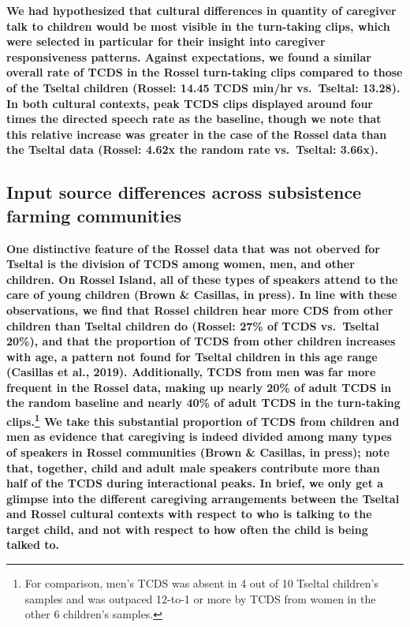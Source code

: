 \documentclass[,man,floatsintext]{apa6}
\begin{document}
\textbf{We had hypothesized that cultural differences in quantity of
caregiver talk to children would be most visible in the turn-taking
clips, which were selected in particular for their insight into
caregiver responsiveness patterns. Against expectations, we found a
similar overall rate of TCDS in the Rossel turn-taking clips compared to
those of the Tseltal children (Rossel: 14.45 TCDS min/hr vs.~Tseltal:
13.28). In both cultural contexts, peak TCDS clips displayed around four
times the directed speech rate as the baseline, though we note that this
relative increase was greater in the case of the Rossel data than the
Tseltal data (Rossel: 4.62x the random rate vs.~Tseltal: 3.66x).}

\subsection{\texorpdfstring{\textbf{Input source differences across
subsistence farming
communities}}{Input source differences across subsistence farming communities}}\label{input-source-differences-across-subsistence-farming-communities}

\textbf{One distinctive feature of the Rossel data that was not oberved
for Tseltal is the division of TCDS among women, men, and other
children. On Rossel Island, all of these types of speakers attend to the
care of young children (Brown \& Casillas, in press). In line with these
observations, we find that Rossel children hear more CDS from other
children than Tseltal children do (Rossel: 27\% of TCDS vs.~Tseltal
20\%), and that the proportion of TCDS from other children increases
with age, a pattern not found for Tseltal children in this age range
(Casillas et al., 2019). Additionally, TCDS from men was far more
frequent in the Rossel data, making up nearly 20\% of adult TCDS in the
random baseline and nearly 40\% of adult TCDS in the turn-taking
clips.\footnote{For comparison, men's TCDS was absent in 4 out of 10
  Tseltal children's samples and was outpaced 12-to-1 or more by TCDS
  from women in the other 6 children's samples.} We take this
substantial proportion of TCDS from children and men as evidence that
caregiving is indeed divided among many types of speakers in Rossel
communities (Brown \& Casillas, in press); note that, together, child
and adult male speakers contribute more than half of the TCDS during
interactional peaks. In brief, we only get a glimpse into the different
caregiving arrangements between the Tseltal and Rossel cultural contexts
with respect to who is talking to the target child, and not with respect
to how often the child is being talked to.}
\end{document}
